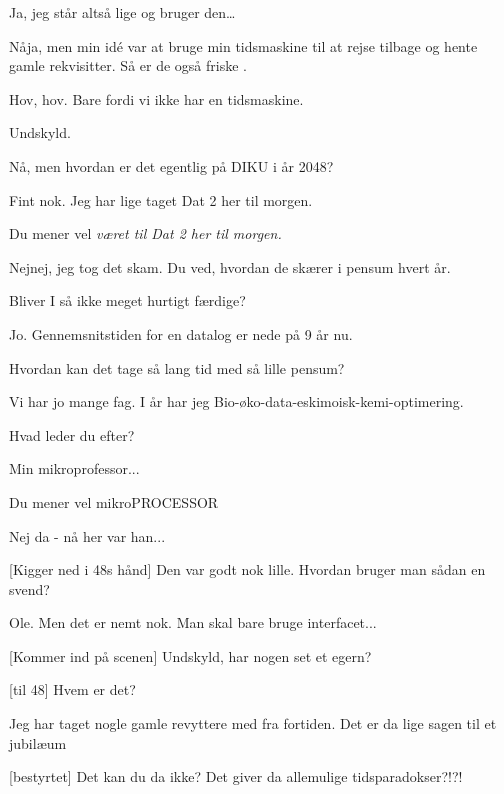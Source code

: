 \documentclass[a4paper,11pt]{article}
\begin{document}
\begin{sketch}
   Ja, jeg står altså lige og bruger den\ldots
  
   Nåja, men min idé var at bruge min tidsmaskine til at
  rejse tilbage og hente gamle rekvisitter. Så er de også friske
  .
  
   Hov, hov. Bare fordi vi ikke har en tidsmaskine.
  
   Undskyld.
  
   Nå, men hvordan er det egentlig på DIKU i år 2048?
  
   Fint nok. Jeg har lige taget Dat 2 her til morgen.
  
   Du mener vel \em{været} til Dat 2 her til morgen.
  
   Nejnej, jeg tog det skam. Du ved, hvordan de skærer i
  pensum hvert år.
  
   Bliver I så ikke meget hurtigt færdige?
  
   Jo. Gennemsnitstiden for en datalog er nede på 9 år nu.
  
   Hvordan kan det tage så lang tid med så lille pensum?
  
   Vi har jo mange fag. I år har jeg
  Bio-øko-data-eskimoisk-kemi-optimering. 
  
   Hvad leder du efter?

   Min mikroprofessor...
  
   Du mener vel mikroPROCESSOR
  
   Nej da - nå her var han...
  
   [Kigger ned i 48s hånd] Den var godt nok lille. Hvordan
  bruger man sådan en svend?
  
   Ole. Men det er nemt nok. Man skal bare bruge interfacet...

  
   [Kommer ind på scenen] Undskyld, har nogen set et egern?
  
   [til 48] Hvem er det?
  
   Jeg har taget nogle gamle revyttere med fra fortiden. Det
  er da lige sagen til et jubilæum
  
   [bestyrtet] Det kan du da ikke? Det giver da allemulige
  tidsparadokser?!?!
  

\end{sketch}
\end{document}
